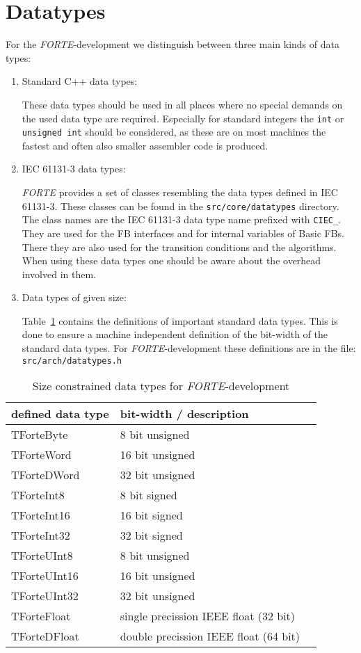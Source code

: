 \documentclass[final,a4paper,10pt, oneside]{article}
\begin{document}
\section{Datatypes}
For the \emph{FORTE}-development we distinguish between three main kinds of data types:
\begin{enumerate}
\item Standard C++ data types:

These data types should be used in all places where no special demands on the used data 
type are required. Especially for standard integers the \verb=int= or \verb=unsigned int= 
should be considered, 
as these are on most machines the fastest and often also smaller assembler code is produced. 

\item IEC 61131-3 data types:

\emph{FORTE} provides a set of classes resembling the data types defined in IEC 61131-3. These classes can be found in the \verb|src/core/datatypes| directory. The class names are the IEC 61131-3 data type name prefixed with \verb=CIEC_=. They are used for the FB interfaces and for internal variables of Basic FBs. There they are also used for the transition conditions and the algorithms. When using these data types one should be aware about the overhead involved in them.

\item Data types of given size: 

Table~\ref{tab:datatypes} contains the definitions of important standard data types. This is done to ensure a machine independent definition of the bit-width of the standard data types. For \emph{FORTE}-development these definitions are in the file: \verb|src/arch/datatypes.h|
\end{enumerate}

\begin{table}[ht]
	\centering
	 \caption{Size constrained data types for \emph{FORTE}-development} \label{tab:datatypes}
		\begin{tabular}{lll}
			defined data type	& bit-width / description\\
			\hline
			TForteByte	&	8 bit unsigned\\
			TForteWord	&	16 bit unsigned	\\
			TForteDWord	&	32 bit unsigned	 \\
			TForteInt8	&	8 bit signed	 \\
			TForteInt16	&	16 bit signed	 \\
			TForteInt32	&	32 bit signed	 \\
			TForteUInt8	&	8 bit unsigned	 \\
			TForteUInt16	&	16 bit unsigned	 \\
			TForteUInt32	&	32 bit unsigned	 \\
			TForteFloat	&	single precission IEEE float (32 bit)	 \\
			TForteDFloat	&	double precission IEEE float (64 bit)	
		\end{tabular}
\end{table}
	
\end{document}

